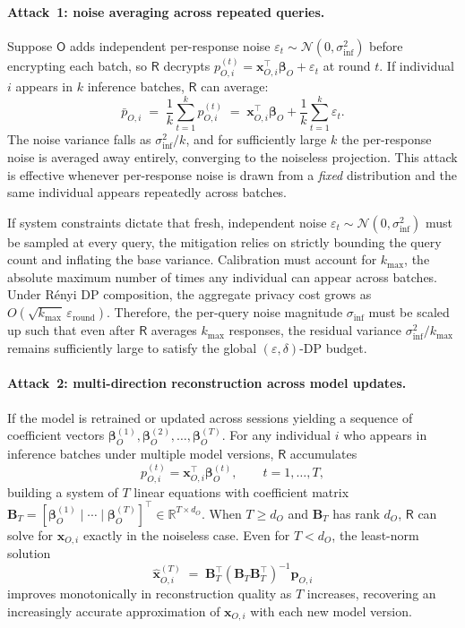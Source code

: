 \documentclass[12pt]{article}
\theoremstyle{definition}
\theoremstyle{plain}
\newcommand{\bbeta}{\boldsymbol{\beta}}
\newcommand{\Party}[1]{\textsf{#1}}
\begin{document}
\paragraph{Attack~1: noise averaging across repeated queries.}
Suppose $\Party{O}$ adds independent per-response noise
$\varepsilon_{t} \sim \mathcal{N}(0,\sigma_{\mathrm{inf}}^{2})$ before
encrypting each batch, so $\Party{R}$ decrypts
$p_{O,i}^{(t)} = \mathbf{x}_{O,i}^{\top}\bbeta_{O} + \varepsilon_{t}$
at round $t$. If individual $i$ appears in $k$ inference batches,
$\Party{R}$ can average:
\[
  \bar{p}_{O,i}
  \;=\; \frac{1}{k}\sum_{t=1}^{k} p_{O,i}^{(t)}
  \;=\; \mathbf{x}_{O,i}^{\top}\bbeta_{O}
        + \frac{1}{k}\sum_{t=1}^{k}\varepsilon_{t}.
\]
The noise variance falls as $\sigma_{\mathrm{inf}}^{2}/k$, and for
sufficiently large $k$ the per-response noise is averaged away entirely,
converging to the noiseless projection. This attack is effective whenever
per-response noise is drawn from a \emph{fixed} distribution and the same
individual appears repeatedly across batches.

If system constraints dictate that fresh, independent noise
$\varepsilon_{t} \sim \mathcal{N}(0,\sigma_{\mathrm{inf}}^{2})$ must be
sampled at every query, the mitigation relies on strictly bounding the
query count and inflating the base variance. Calibration must account for
$k_{\max}$, the absolute maximum number of times any individual can
appear across batches. Under Rényi DP composition, the aggregate privacy
cost grows as $O(\sqrt{k_{\max}}\,\varepsilon_{\mathrm{round}})$.
Therefore, the per-query noise magnitude $\sigma_{\mathrm{inf}}$ must be
scaled up such that even after $\Party{R}$ averages $k_{\max}$ responses,
the residual variance $\sigma_{\mathrm{inf}}^{2}/k_{\max}$ remains
sufficiently large to satisfy the global $(\varepsilon,\delta)$-DP budget.

\paragraph{Attack~2: multi-direction reconstruction across model updates.}
If the model is retrained or
updated across sessions yielding a sequence of coefficient vectors
$\bbeta_{O}^{(1)}, \bbeta_{O}^{(2)}, \ldots, \bbeta_{O}^{(T)}$.
For any individual $i$ who appears in inference batches under multiple model
versions, $\Party{R}$ accumulates
\[
  p_{O,i}^{(t)} = \mathbf{x}_{O,i}^{\top}\bbeta_{O}^{(t)},
  \qquad t = 1,\ldots,T,
\]
building a system of $T$ linear equations with coefficient matrix
$\mathbf{B}_{T} =
  [\bbeta_{O}^{(1)} \mid \cdots \mid \bbeta_{O}^{(T)}]^{\top}
  \in \mathbb{R}^{T \times d_{O}}$.
When $T \geq d_{O}$ and $\mathbf{B}_{T}$ has rank $d_{O}$, $\Party{R}$
can solve for $\mathbf{x}_{O,i}$ exactly in the noiseless case. Even for
$T < d_{O}$, the least-norm solution
\[
  \hat{\mathbf{x}}_{O,i}^{(T)}
  \;=\; \mathbf{B}_{T}^{\top}
        \!\left(\mathbf{B}_{T}\mathbf{B}_{T}^{\top}\right)^{-1}
        \mathbf{p}_{O,i}
\]
improves monotonically in reconstruction quality as $T$ increases,
recovering an increasingly accurate approximation of $\mathbf{x}_{O,i}$
with each new model version.
\end{document}
